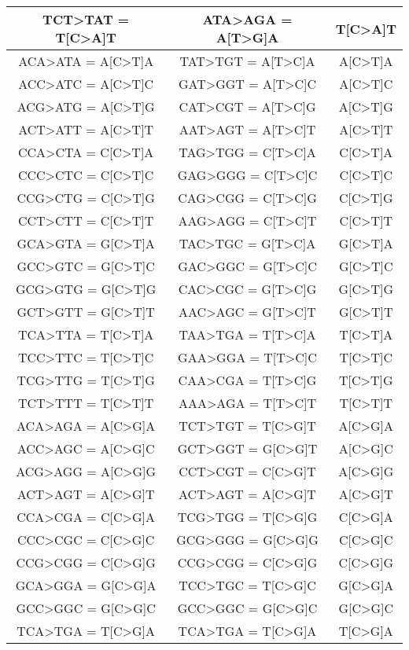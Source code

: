 \begin{longtable}{c|c|c}
TCT>TAT	= T[C>A]T & ATA>AGA	= A[T>G]A &	T[C>A]T \\ \hline
ACA>ATA	= A[C>T]A & TAT>TGT	= A[T>C]A & A[C>T]A \\ \hline
ACC>ATC	= A[C>T]C & GAT>GGT	= A[T>C]C & A[C>T]C \\ \hline
ACG>ATG	= A[C>T]G & CAT>CGT	= A[T>C]G & A[C>T]G \\ \hline
ACT>ATT	= A[C>T]T & AAT>AGT	= A[T>C]T & A[C>T]T \\ \hline
CCA>CTA	= C[C>T]A & TAG>TGG	= C[T>C]A & C[C>T]A \\ \hline
CCC>CTC	= C[C>T]C & GAG>GGG	= C[T>C]C & C[C>T]C \\ \hline
CCG>CTG	= C[C>T]G & CAG>CGG	= C[T>C]G & C[C>T]G \\ \hline
CCT>CTT	= C[C>T]T & AAG>AGG	= C[T>C]T & C[C>T]T \\ \hline
GCA>GTA	= G[C>T]A & TAC>TGC	= G[T>C]A & G[C>T]A \\ \hline
GCC>GTC	= G[C>T]C & GAC>GGC	= G[T>C]C & G[C>T]C \\ \hline
GCG>GTG	= G[C>T]G & CAC>CGC	= G[T>C]G & G[C>T]G \\ \hline
GCT>GTT	= G[C>T]T & AAC>AGC	= G[T>C]T & G[C>T]T \\ \hline
TCA>TTA	= T[C>T]A & TAA>TGA	= T[T>C]A & T[C>T]A \\ \hline
TCC>TTC	= T[C>T]C & GAA>GGA	= T[T>C]C & T[C>T]C \\ \hline
TCG>TTG	= T[C>T]G & CAA>CGA	= T[T>C]G & T[C>T]G \\ \hline
TCT>TTT	= T[C>T]T & AAA>AGA	= T[T>C]T & T[C>T]T \\ \hline
ACA>AGA	= A[C>G]A & TCT>TGT	= T[C>G]T & A[C>G]A \\ \hline
ACC>AGC	= A[C>G]C & GCT>GGT	= G[C>G]T & A[C>G]C \\ \hline
ACG>AGG	= A[C>G]G & CCT>CGT	= C[C>G]T & A[C>G]G \\ \hline
ACT>AGT	= A[C>G]T & ACT>AGT	= A[C>G]T & A[C>G]T \\ \hline
CCA>CGA	= C[C>G]A & TCG>TGG	= T[C>G]G & C[C>G]A \\ \hline
CCC>CGC	= C[C>G]C & GCG>GGG	= G[C>G]G & C[C>G]C \\ \hline
CCG>CGG	= C[C>G]G & CCG>CGG	= C[C>G]G & C[C>G]G \\ \hline
GCA>GGA	= G[C>G]A & TCC>TGC = T[C>G]C & G[C>G]A \\ \hline
GCC>GGC	= G[C>G]C & GCC>GGC = G[C>G]C & G[C>G]C \\ \hline
TCA>TGA	= T[C>G]A & TCA>TGA = T[C>G]A & T[C>G]A \\ \hline

\end{longtable}
